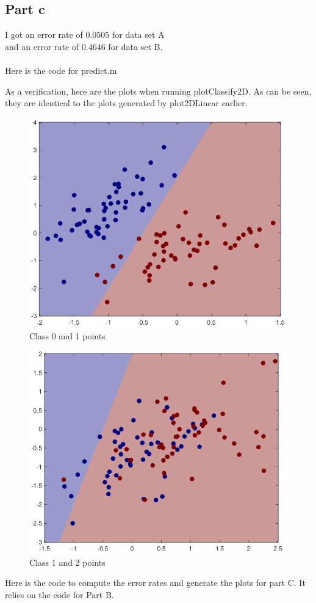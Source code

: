 \documentclass[twoside,11pt]{article}
\theoremstyle{definition}
\begin{document}
\subsection*{Part c}

I got an error rate of $0.0505$ for data set A\\
 and an error rate of $0.4646$ for data set B.\\
\\
Here is the code for predict.m

\newpage
As a verification, here are the plots when running plotClassify2D. As can be seen, they are identical to the plots generated by plot2DLinear earlier.
\begin{figure}[h]
\centering
\includegraphics[width=3.5 in]{prob1cPlotA.png}
\caption{Class 0 and 1 points}
\end{figure}
\begin{figure}[h]
\centering
\includegraphics[width=3.5 in]{prob1cPlotB.png}
\caption{Class 1 and 2 points}
\end{figure}

\newpage
Here is the code to compute the error rates and generate the plots for part C. It relies on the code for Part B.

\end{document}
